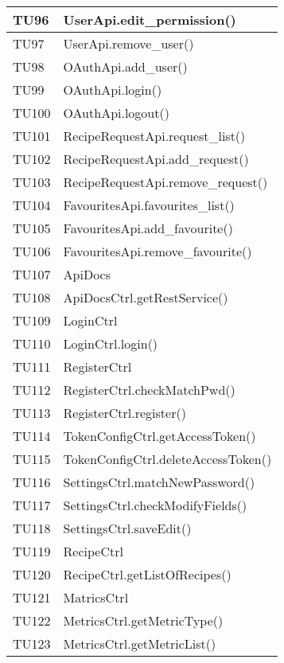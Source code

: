 \begin{center}
\begin{longtable}{| p{3cm} | p{9.5cm} |}
					\hline
					TU96 & UserApi.edit\_permission() \\
					\hline
					TU97 & UserApi.remove\_user() \\
					\hline
					TU98 & OAuthApi.add\_user() \\
					\hline
					TU99 & OAuthApi.login() \\
					\hline
					TU100 & OAuthApi.logout() \\
					\hline
					TU101 & RecipeRequestApi.request\_list() \\
					\hline
					TU102 & RecipeRequestApi.add\_request() \\
					\hline
					TU103 & RecipeRequestApi.remove\_request() \\
					\hline
					TU104 & FavouritesApi.favourites\_list() \\
					\hline
					TU105 & FavouritesApi.add\_favourite() \\
					\hline
					TU106 & FavouritesApi.remove\_favourite() \\
					\hline
					TU107 & ApiDocs \\
					\hline
					TU108 & ApiDocsCtrl.getRestService() \\
					\hline
					TU109 & LoginCtrl \\
					\hline
					TU110 & LoginCtrl.login() \\
					\hline
					TU111 & RegisterCtrl \\
					\hline
					TU112 & RegisterCtrl.checkMatchPwd() \\
					\hline
					TU113 & RegisterCtrl.register() \\
					\hline
					TU114 & TokenConfigCtrl.getAccessToken() \\
					\hline
					TU115 & TokenConfigCtrl.deleteAccessToken() \\
					\hline
					TU116 & SettingsCtrl.matchNewPassword() \\
					\hline
					TU117 & SettingsCtrl.checkModifyFields() \\
					\hline
					TU118 & SettingsCtrl.saveEdit() \\
					\hline
					TU119 & RecipeCtrl \\
					\hline
					TU120 & RecipeCtrl.getListOfRecipes() \\
					\hline
					TU121 & MatricsCtrl \\
					\hline
					TU122 & MetricsCtrl.getMetricType() \\
					\hline
					TU123 & MetricsCtrl.getMetricList() \\

\end{longtable}
\end{center}

